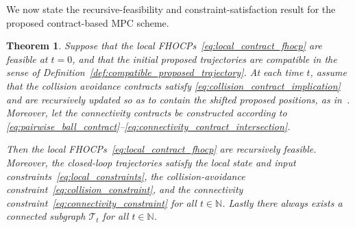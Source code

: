 \documentclass[letterpaper, 10 pt, conference]{ieeeconf}  %
\newtheorem{theorem}{Theorem}
\begin{document}
We now state the recursive-feasibility and constraint-satisfaction result for
the proposed contract-based MPC scheme.
\begin{theorem}
	\label{thm:recursive_feasibility}
	Suppose that the local FHOCPs~\eqref{eq:local_contract_fhocp} are feasible at
	$t=0$, and that the initial proposed trajectories are compatible in the sense of
	Definition~\ref{def:compatible_proposed_trajectory}. At each time $t$, assume
	that the collision avoidance contracts satisfy
	\eqref{eq:collision_contract_implication} and are recursively updated so as to
	contain the shifted proposed positions, as in~\cite{bodmer2026anytime}.
	Moreover, let the connectivity contracts be constructed according to
	\eqref{eq:pairwise_ball_contract}--\eqref{eq:connectivity_contract_intersection}.

	Then the local FHOCPs~\eqref{eq:local_contract_fhocp} are recursively feasible.
	Moreover, the closed-loop trajectories satisfy the local state and input
	constraints~\eqref{eq:local_constraints}, the collision-avoidance
	constraint~\eqref{eq:collision_constraint}, and the connectivity
	constraint~\eqref{eq:connectivity_constraint} for all $t\in\mathbb{N}$.
	Lastly there always exists a connected subgraph $\mathcal{T}_t$ for all $t\in\mathbb{N}$.
\end{theorem}
\end{document}
